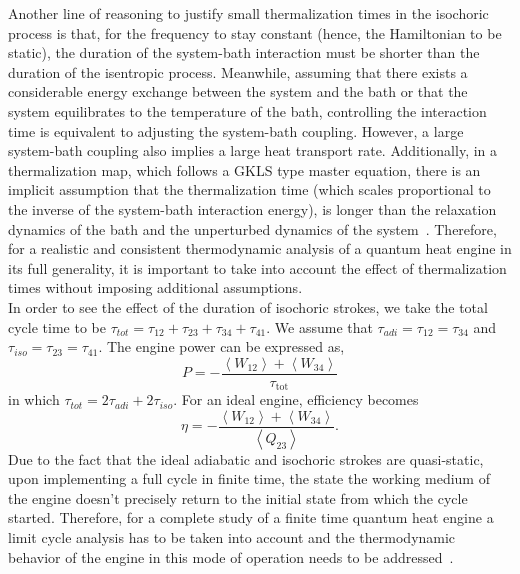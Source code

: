 \documentclass[aps,pra,twocolumn,showpacs,showkeys,groupedaddress,nobalancelastpage,nofootinbib,floatfix,superscriptaddress,longbibliography]{revtex4-2}
\begin{document}
Another line of reasoning to justify small thermalization times in the isochoric process is that, for the frequency to stay constant (hence, the Hamiltonian to be static), the duration of the system-bath interaction must be shorter than the duration of the isentropic process. Meanwhile, assuming that there exists a considerable energy exchange between the system and the bath or that the system equilibrates to the temperature of the bath, controlling the
interaction time is equivalent to adjusting the system-bath coupling. However, a large system-bath coupling also implies a large heat transport rate. Additionally, in a thermalization map, which follows a GKLS type master equation, there is an implicit assumption that the thermalization time (which scales proportional to the inverse of the system-bath interaction energy), is longer than the relaxation dynamics of the bath and the unperturbed dynamics of the
system~\cite{1979}. Therefore, for a realistic and consistent thermodynamic analysis of a quantum heat engine in its full generality, it is important to take into account the effect of thermalization times without imposing additional assumptions.\\

In order to see the effect of the duration of isochoric strokes, we take the total cycle time to be $\tau_{tot} = \tau_{12} + \tau_{23} + \tau_{34} + \tau_{41}$. We assume that $\tau_{adi}=\tau_{12} = \tau_{34}$ and $\tau_{iso}=\tau_{23} = \tau_{41}$. The engine power can be expressed as,
\begin{equation}\label{engine.power}
  P = -\frac{\left\langle W_{12}\right\rangle + \left\langle W_{34}\right\rangle}{\tau_{\text{tot}}}
\end{equation}
in which $\tau_{tot}=2\tau_{adi}+2\tau_{iso}$. For an ideal engine, efficiency becomes
\begin{equation}\label{engine.efficiency}
  \eta = -\frac{\left\langle W_{12}\right\rangle + \left\langle W_{34}\right\rangle}{\left\langle Q_{23}\right\rangle}.
\end{equation}
Due to the fact that the ideal adiabatic and isochoric strokes are quasi-static, upon implementing a full cycle in finite time, the state
the working medium of the engine doesn't precisely return to the initial state from which the cycle started. Therefore, for a complete study of a finite time quantum heat engine a limit cycle analysis has to be taken into account and the thermodynamic behavior of the engine in this mode of operation needs to be
addressed~\cite{Kosloff2017TheQH,PhysRevE.97.062153,PhysRevE.70.046110}.\\
\end{document}
